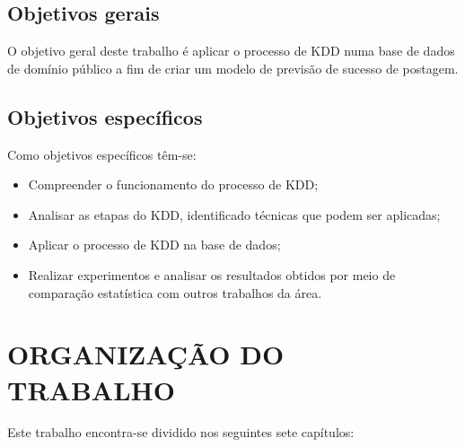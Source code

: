 \subsection{Objetivos gerais}
\label{subsec:objGerais}
O objetivo geral deste trabalho é aplicar o processo de KDD numa base de dados de domínio público a fim de criar um modelo de previsão de sucesso de postagem.

\subsection{Objetivos específicos}
\label{subsec:objEspecificos}
Como objetivos específicos têm-se:
\begin{itemize}
	\item Compreender o funcionamento do processo de KDD;
	\item Analisar as etapas do KDD, identificado técnicas que podem ser aplicadas;
	\item Aplicar o processo de KDD na base de dados;
	\item Realizar experimentos e analisar os resultados obtidos por meio de comparação estatística com outros trabalhos da área.
\end{itemize}

\section{ORGANIZAÇÃO DO TRABALHO}
\label{sec:organizacaoTrabalho}
Este trabalho encontra-se dividido nos seguintes sete capítulos:

